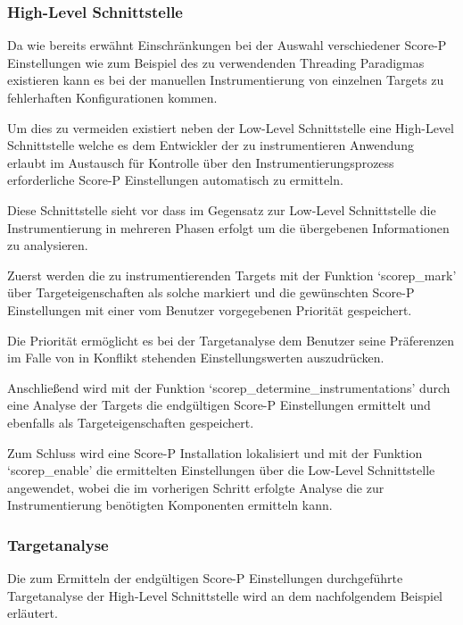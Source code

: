 \documentclass[german,proseminar,hyperref,utf8]{zihpub}
\begin{document}
    \subsubsection{High-Level Schnittstelle}
    Da wie bereits erwähnt Einschränkungen bei der Auswahl verschiedener Score-P Einstellungen wie zum
    Beispiel des zu verwendenden Threading Paradigmas existieren kann es bei der manuellen Instrumentierung
    von einzelnen Targets zu fehlerhaften Konfigurationen kommen.

    Um dies zu vermeiden existiert neben der Low-Level Schnittstelle eine High-Level Schnittstelle
    welche es dem Entwickler der zu instrumentieren Anwendung erlaubt im Austausch für Kontrolle
    über den Instrumentierungsprozess erforderliche Score-P Einstellungen automatisch zu ermitteln.

    Diese Schnittstelle sieht vor dass im Gegensatz zur Low-Level Schnittstelle die Instrumentierung
    in mehreren Phasen erfolgt um die übergebenen Informationen zu analysieren.

    Zuerst werden die zu instrumentierenden Targets mit der Funktion `scorep\_mark' über Targeteigenschaften
    als solche markiert und die gewünschten Score-P Einstellungen mit einer vom Benutzer vorgegebenen
    Priorität gespeichert.

    Die Priorität ermöglicht es bei der Targetanalyse dem Benutzer seine Präferenzen im Falle von
    in Konflikt stehenden Einstellungswerten auszudrücken.

    Anschlie{\ss}end wird mit der Funktion `scorep\_determine\_instrumentations' durch eine Analyse der Targets
    die endgültigen Score-P Einstellungen ermittelt und ebenfalls als Targeteigenschaften gespeichert.

    Zum Schluss wird eine Score-P Installation lokalisiert und mit der Funktion `scorep\_enable'
    die ermittelten Einstellungen über die Low-Level Schnittstelle angewendet, wobei die im vorherigen
    Schritt erfolgte Analyse die zur Instrumentierung benötigten Komponenten ermitteln kann.

    \subsubsection{Targetanalyse}
    Die zum Ermitteln der endgültigen Score-P Einstellungen durchgeführte Targetanalyse der High-Level
    Schnittstelle wird an dem nachfolgendem Beispiel erläutert.
\end{document}
